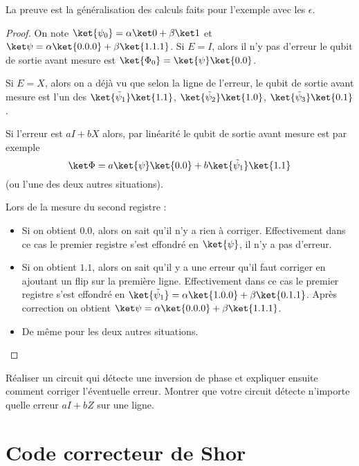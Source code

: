 \documentclass[11pt,class=report,crop=false]{standalone}
\begin{document}
La preuve est la généralisation des calculs faits pour l'exemple avec les \og{}$\epsilon$\fg{}.
\begin{proof}
On note $\ket{\psi_0} = \alpha\ket0+\beta\ket1$ et $\ket\psi = \alpha\ket{0.0.0} + \beta\ket{1.1.1}$.
Si $E=I$, alors il n'y pas d'erreur le qubit de sortie avant mesure est 
$\ket{\Phi_0} = \ket{\psi} \ket{0.0}$.

Si $E=X$, alors on a déjà vu que selon la ligne de l'erreur, le qubit de sortie avant mesure est l'un des $\ket{\tilde \psi_1} \ket{1.1}$, $\ket{\tilde \psi_2} \ket{1.0}$,
$\ket{\tilde \psi_3} \ket{0.1}$.

Si l'erreur est $aI+bX$ alors, par linéarité le qubit de sortie avant mesure est par exemple
$$\ket\Phi = a \ket{\psi} \ket{0.0} + b \ket{\tilde \psi_1} \ket{1.1}$$
(ou l'une des deux autres situations).

Lors de la mesure du second registre :
\begin{itemize}
  \item Si on obtient $0.0$, alors on sait qu'il n'y a rien à corriger. Effectivement dans ce cas le premier registre s'est effondré en $\ket{\psi}$, il n'y a pas d'erreur.


  \item Si on obtient $1.1$, alors on sait qu'il y a une erreur qu'il faut corriger en ajoutant un flip sur la première ligne. Effectivement dans ce cas le premier registre s'est effondré en $\ket{\tilde \psi_1} = \alpha\ket{1.0.0}+\beta\ket{0.1.1}$. Après correction on obtient $\ket\psi = \alpha\ket{0.0.0} + \beta\ket{1.1.1}$.

  \item De même pour les deux autres situations.
\end{itemize}
\end{proof}


\begin{exercicecours}
Réaliser un circuit qui détecte une inversion de phase et expliquer ensuite comment corriger l'éventuelle erreur. Montrer que votre circuit détecte n'importe quelle erreur $aI+bZ$ sur une ligne.
\end{exercicecours}

\section{Code correcteur de Shor}

\end{document}
